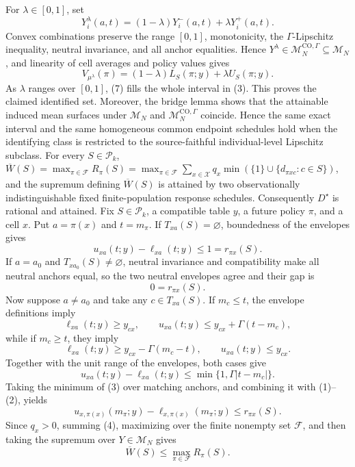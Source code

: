 For \(\lambda\in[0,1]\), set
\[
Y_i^\lambda(a,t)=(1-\lambda)Y_i^-(a,t)+\lambda Y_i^+(a,t).
\]
Convex combinations preserve the range \([0,1]\), monotonicity, the \(\Gamma\)-Lipschitz inequality, neutral invariance, and all anchor equalities.  Hence \(Y^\lambda\in\mathcal M_N^{\mathrm{CO},\Gamma}\subseteq\mathcal M_N\), and linearity of cell averages and policy values gives
\[
V_{\mu^\lambda}(\pi)
=(1-\lambda)L_S(\pi;y)+\lambda U_S(\pi;y).
\tag{7}
\]
As \(\lambda\) ranges over \([0,1]\), (7) fills the whole interval in (3).  This proves the claimed identified set.  Moreover, the bridge lemma shows that the attainable induced mean surfaces under \(\mathcal M_N\) and \(\mathcal M_N^{\mathrm{CO},\Gamma}\) coincide.  Hence the same exact interval and the same homogeneous common endpoint schedules hold when the identifying class is restricted to the source-faithful individual-level Lipschitz subclass.
For every \(S\in\mathcal P_k\), \(\overline W(S)=\max_{\pi\in\mathcal F}R_{\pi}(S)=\max_{\pi\in\mathcal F}\sum_{x\in\mathcal X}q_x\min(\{1\}\cup\{d_{\pi xc}:c\in S\})\), and the supremum defining \(\overline W(S)\) is attained by two observationally indistinguishable fixed finite-population response schedules. Consequently \(D^{\star}\) is rational and attained.
Fix \(S\in\mathcal P_k\), a compatible table \(y\), a future policy \(\pi\), and a cell \(x\).  Put \(a=\pi(x)\) and \(t=m_\pi\).  If \(T_{xa}(S)=\varnothing\), boundedness of the envelopes gives
\[
u_{xa}(t;y)-\ell_{xa}(t;y)\leq1=r_{\pi x}(S).
\tag{1}
\]
If \(a=a_0\) and \(T_{x a_0}(S)\neq\varnothing\), neutral invariance and compatibility make all neutral anchors equal, so the two neutral envelopes agree and their gap is
\[
0=r_{\pi x}(S).
\tag{2}
\]
Now suppose \(a\neq a_0\) and take any \(c\in T_{xa}(S)\).  If \(m_c\leq t\), the envelope definitions imply
\[
\ell_{xa}(t;y)\geq y_{cx},
\qquad
u_{xa}(t;y)\leq y_{cx}+\Gamma(t-m_c),
\]
while if \(m_c\geq t\), they imply
\[
\ell_{xa}(t;y)\geq y_{cx}-\Gamma(m_c-t),
\qquad
u_{xa}(t;y)\leq y_{cx}.
\]
Together with the unit range of the envelopes, both cases give
\[
u_{xa}(t;y)-\ell_{xa}(t;y)
\leq\min\{1,\Gamma|t-m_c|\}.
\tag{3}
\]
Taking the minimum of (3) over matching anchors, and combining it with (1)--(2), yields
\[
u_{x,\pi(x)}(m_\pi;y)-\ell_{x,\pi(x)}(m_\pi;y)
\leq r_{\pi x}(S).
\tag{4}
\]
Since \(q_x>0\), summing (4), maximizing over the finite nonempty set \(\mathcal F\), and then taking the supremum over \(Y\in\mathcal M_N\) gives
\[
\overline W(S)\leq\max_{\pi\in\mathcal F}R_\pi(S).
\tag{5}
\]

